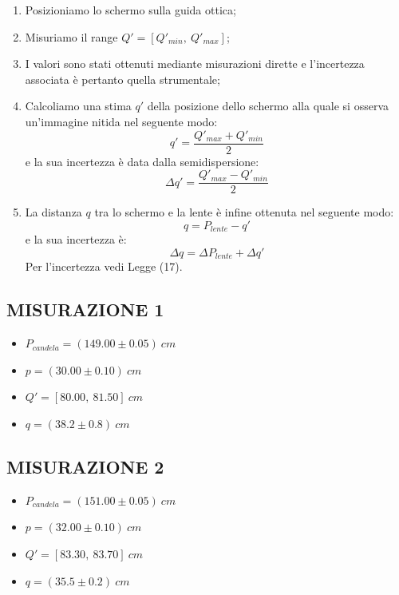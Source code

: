\begin{enumerate}
	\item Posizioniamo lo schermo sulla guida ottica;
	\item Misuriamo il range $Q'=[Q'_{min},\ Q'_{max}]$;
	\item I valori sono stati ottenuti mediante misurazioni dirette e l'incertezza associata è pertanto quella strumentale;
	\item Calcoliamo una stima $q'$ della posizione dello schermo alla quale si osserva un'immagine nitida nel seguente modo:
	\begin{equation}
		q'=\frac{Q'_{max}+Q'_{min}}{2}
	\end{equation}
	e la sua incertezza è data dalla semidispersione:
	\begin{equation}
		\Delta q'= \frac{Q'_{max}-Q'_{min}}{2}
	\end{equation}
	\item La distanza $q$ tra lo schermo e la lente è infine ottenuta nel seguente modo:
	\begin{equation}
		q = P_{lente} - q'
	\end{equation}
	e la sua incertezza è:
	\begin{equation}
		\Delta q = \Delta P_{lente} + \Delta q'
	\end{equation}
	Per l'incertezza vedi Legge (17).
\end{enumerate}



\subsection{MISURAZIONE 1}
\begin{itemize}
	\item $P_{candela}=(149.00\pm 0.05)\ cm$
	\item $p = (30.00\pm 0.10)\ cm$
	\item $Q' = [80.00,\ 81.50]\ cm$
	\item $q = (38.2\pm 0.8)\ cm$
\end{itemize}

\subsection{MISURAZIONE 2}
\begin{itemize}
	\item $P_{candela}=(151.00\pm 0.05)\ cm$
	\item $p = (32.00\pm 0.10)\ cm$
	\item $Q' = [83.30,\ 83.70]\ cm$
	\item $q = (35.5\pm 0.2)\ cm$
\end{itemize}

